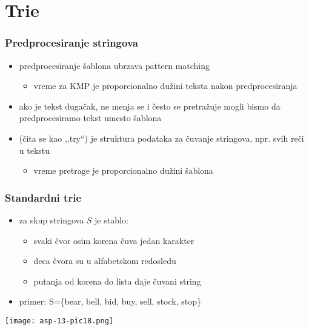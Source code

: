 \documentclass[compress,aspectratio=169]{beamer}
\begin{document}
\section[Trie]{Trie}

\begin{frame}[fragile]
  \frametitle{Predprocesiranje stringova}
  \begin{itemize}
    \item predprocesiranje šablona ubrzava pattern matching
    \begin{itemize}
      \item vreme za KMP je proporcionalno dužini teksta nakon predprocesiranja
    \end{itemize}
    \item ako je tekst dugačak, ne menja se i često se pretražuje mogli bismo
    da predprocesiramo tekst umesto šablona
    \item {} (čita se kao ,,try``) je struktura podataka za čuvanje
    stringova, npr. svih reči u tekstu
    \begin{itemize}
      \item vreme pretrage je proporcionalno dužini šablona
    \end{itemize}
  \end{itemize}
\end{frame}

\begin{frame}[fragile]
  \frametitle{Standardni trie}
  \begin{itemize}
    \item {} za skup stringova $S$ je stablo:
    \begin{itemize}
      \item svaki čvor osim korena čuva jedan karakter
      \item deca čvora su u alfabetskom redosledu
      \item putanja od korena do lista daje čuvani string
    \end{itemize}
    \item primer: S=\{bear, bell, bid, buy, sell, stock, stop\}
  \end{itemize}
  \begin{center}
    \texttt{[image: asp-13-pic18.png]}
  \end{center}
\end{frame}
\end{document}
